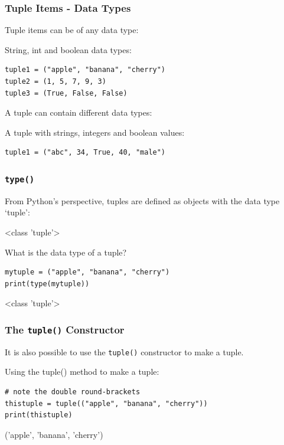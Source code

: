 \documentclass[12pt,a4paper]{article}
\newcommand{\code}[1]{%
	\colorbox{backcolour}{\lstinline{#1}}%
}
\newcommand{\lcode}[1]{%
	\lstinline{#1}%
}
\begin{document}
\subsubsection{Tuple Items - Data Types}

Tuple items can be of any data type:

\begin{ebox}
String, int and boolean data types:
	\begin{lstlisting}
tuple1 = ("apple", "banana", "cherry")
tuple2 = (1, 5, 7, 9, 3)
tuple3 = (True, False, False)
	\end{lstlisting}
\end{ebox}

A tuple can contain different data types:

\begin{ebox}
A tuple with strings, integers and boolean values:
	\begin{lstlisting}
tuple1 = ("abc", 34, True, 40, "male")
	\end{lstlisting}
\end{ebox}
\subsubsection{\lcode{type()}}

From Python's perspective, tuples are defined as objects with the data type `tuple':

\begin{vercode}
 <class 'tuple'>
\end{vercode}

\begin{ebox}
What is the data type of a tuple?
	\begin{lstlisting}
mytuple = ("apple", "banana", "cherry")
print(type(mytuple))
	\end{lstlisting}
\tcblower
	\begin{vercode}
 <class 'tuple'>
	\end{vercode}
\end{ebox}
\subsubsection{The \lcode{tuple()} Constructor}

It is also possible to use the \code{tuple()} constructor to make a tuple.

\begin{ebox}
Using the tuple() method to make a tuple:
	\begin{lstlisting}
# note the double round-brackets
thistuple = tuple(("apple", "banana", "cherry"))
print(thistuple)
	\end{lstlisting}
\tcblower
	\begin{vercode}
('apple', 'banana', 'cherry')
	\end{vercode}
\end{ebox}
\end{document}
